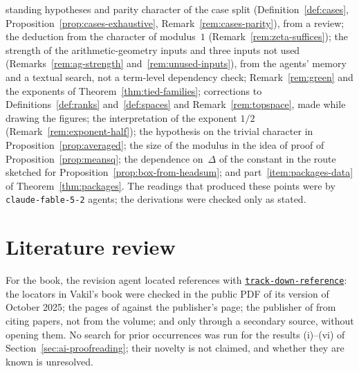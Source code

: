 \documentclass[11pt]{amsbook}
\theoremstyle{plain}
\theoremstyle{definition}
\theoremstyle{remark}
\numberwithin{equation}{section}
\numberwithin{figure}{chapter}
\numberwithin{table}{chapter}
\newcommand{\vtwoskillurl}{https://github.com/tdupu/%
agent-skills-public/blob/8d13efb5e66306aeae6e3b948bc463e7e2db1b65}
\newcommand{\vtwoskill}[1]{%
\href{\vtwoskillurl/skills/#1/SKILL.md}{\texttt{#1}}}
\begin{document}
\begin{enumerate}[label=(\roman*),resume]
standing hypotheses and parity character of the case split
(Definition~\ref{def:cases}, Proposition~\ref{prop:cases-exhaustive},
Remark~\ref{rem:cases-parity}), from a review; the deduction from the
character of modulus~$1$ (Remark~\ref{rem:zeta-suffices}); the
strength of the arithmetic-geometry inputs and three inputs not used
(Remarks~\ref{rem:ag-strength} and~\ref{rem:unused-inputs}), from the
agents' memory and a textual search, not a term-level dependency
check; Remark~\ref{rem:green} and the exponents of
Theorem~\ref{thm:tied-families}; corrections to
Definitions~\ref{def:ranks} and~\ref{def:spaces} and
Remark~\ref{rem:topspace}, made while drawing the figures; the
interpretation of the exponent $1/2$ (Remark~\ref{rem:exponent-half});
the hypothesis on the trivial character in
Proposition~\ref{prop:averaged}; the size of the modulus in the idea
of proof of Proposition~\ref{prop:meansq}; the dependence on~$\Delta$
of the constant in the route sketched for
Proposition~\ref{prop:box-from-headsum}; and
part~\ref{item:packages-data} of Theorem~\ref{thm:packages}. The
readings that produced these points were by \texttt{claude-fable-5-2}
agents; the derivations were checked only as stated.
\end{enumerate}

\section{Literature review}
\label{sec:ai-literature}
For the book, the revision agent located references with
\vtwoskill{track-down-reference}: the locators in Vakil's book
\cite{Vakil2025} were checked in the public PDF of its version of
October 2025; the pages of \cite{Chen2010} against the publisher's
page; the publisher of \cite{Waldspurger1990} from citing papers, not
from the volume; and \cite{Patterson1977,KazhdanPatterson1984,%
ChintaFriedbergHoffstein2012} only through a secondary source, without
opening them. No search for prior occurrences was run for the results
(i)--(vi) of Section~\ref{sec:ai-proofreading}; their novelty is not
claimed, and whether they are known is unresolved.
\end{document}
